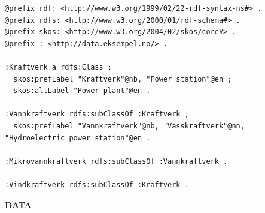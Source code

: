 \documentclass{dt}
\begin{document}
\begin{frame}[fragile]{}
\begin{code}
\begin{verbatim}
@prefix rdf: <http://www.w3.org/1999/02/22-rdf-syntax-ns#> .
@prefix rdfs: <http://www.w3.org/2000/01/rdf-schema#> .
@prefix skos: <http://www.w3.org/2004/02/skos/core#> .
@prefix : <http://data.eksempel.no/> .

:Kraftverk a rdfs:Class ;
  skos:prefLabel "Kraftverk"@nb, "Power station"@en ;
  skos:altLabel "Power plant"@en .

:Vannkraftverk rdfs:subClassOf :Kraftverk ;
  skos:prefLabel "Vannkraftverk"@nb, "Vasskraftverk"@nn, "Hydroelectric power station"@en .

:Mikrovannkraftverk rdfs:subClassOf :Vannkraftverk .

:Vindkraftverk rdfs:subClassOf :Kraftverk .
\end{verbatim}
\end{code}
\end{frame}

\begin{frame}{}


\end{frame}


\begin{frame}
\Huge{\textbf{DATA}}
\end{frame}
\end{document}

